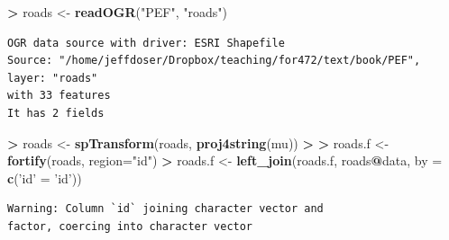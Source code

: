 \documentclass[]{krantz}
\makeatletter
\newenvironment{Shaded}{\begin{snugshade}}{\end{snugshade}}
\newcommand{\DataTypeTok}[1]{\textcolor[rgb]{0.27,0.27,0.27}{#1}}
\newcommand{\ErrorTok}[1]{\textcolor[rgb]{0.14,0.14,0.14}{\textbf{#1}}}
\newcommand{\KeywordTok}[1]{\textcolor[rgb]{0.27,0.27,0.27}{\textbf{#1}}}
\newcommand{\NormalTok}[1]{#1}
\newcommand{\OperatorTok}[1]{\textcolor[rgb]{0.43,0.43,0.43}{\textbf{#1}}}
\newcommand{\StringTok}[1]{\textcolor[rgb]{0.5,0.5,0.5}{#1}}
\newenvironment{kframe}{%
\medskip{}
\setlength{\fboxsep}{.8em}
 \def\at@end@of@kframe{}%
 \ifinner\ifhmode%
  \def\at@end@of@kframe{\end{minipage}}%
  \begin{minipage}{\columnwidth}%
 \fi\fi%
 \def\FrameCommand##1{\hskip\@totalleftmargin \hskip-\fboxsep
 \colorbox{shadecolor}{##1}\hskip-\fboxsep
     \hskip-\linewidth \hskip-\@totalleftmargin \hskip\columnwidth}%
 \MakeFramed {\advance\hsize-\width
   \@totalleftmargin\z@ \linewidth\hsize
   \@setminipage}}%
 {\par\unskip\endMakeFramed%
 \at@end@of@kframe}
\renewenvironment{Shaded}{\begin{kframe}}{\end{kframe}}
\makeatother
\begin{document}
\begin{Shaded}
\begin{Highlighting}[]
\OperatorTok{>}\StringTok{ }\NormalTok{roads <-}\StringTok{ }\KeywordTok{readOGR}\NormalTok{(}\StringTok{"PEF"}\NormalTok{, }\StringTok{"roads"}\NormalTok{)}
\end{Highlighting}
\end{Shaded}

\begin{verbatim}
OGR data source with driver: ESRI Shapefile 
Source: "/home/jeffdoser/Dropbox/teaching/for472/text/book/PEF", layer: "roads"
with 33 features
It has 2 fields
\end{verbatim}

\begin{Shaded}
\begin{Highlighting}[]
\OperatorTok{>}\StringTok{ }\NormalTok{roads <-}\StringTok{ }\KeywordTok{spTransform}\NormalTok{(roads, }\KeywordTok{proj4string}\NormalTok{(mu))}
\OperatorTok{>}\StringTok{ }
\ErrorTok{>}\StringTok{ }\NormalTok{roads.f <-}\StringTok{ }\KeywordTok{fortify}\NormalTok{(roads, }\DataTypeTok{region=}\StringTok{"id"}\NormalTok{)}
\OperatorTok{>}\StringTok{ }\NormalTok{roads.f <-}\StringTok{ }\KeywordTok{left_join}\NormalTok{(roads.f, roads}\OperatorTok{@}\NormalTok{data, }\DataTypeTok{by =} \KeywordTok{c}\NormalTok{(}\StringTok{'id'}\NormalTok{ =}\StringTok{ 'id'}\NormalTok{))}
\end{Highlighting}
\end{Shaded}

\begin{verbatim}
Warning: Column `id` joining character vector and
factor, coercing into character vector
\end{verbatim}
\end{document}
